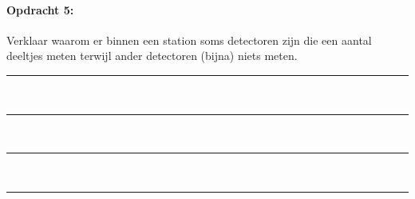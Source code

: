 \begin{minipage}[t]{1\columnwidth}%

\paragraph{Opdracht 5:}

Verklaar waarom er binnen een station soms detectoren zijn
die een aantal deeltjes meten terwijl ander detectoren (bijna) niets
meten.

\begin{center}
    \rule{\textwidth}{0.3mm}\\
    \rule{\textwidth}{0.3mm}\\
    \rule{\textwidth}{0.3mm}\\
    \rule{\textwidth}{0.3mm}\\
\end{center}
\end{minipage}

